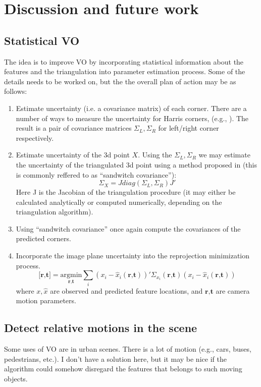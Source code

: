 \documentclass[10pt]{article}         %
\begin{document}
\section{Discussion and future work}

\subsection{Statistical VO}

The idea is to improve VO by incorporating statistical information about the features and the triangulation into parameter estimation process. Some of the details needs to be worked on, but the the overall plan of action may be as follows:
\begin{enumerate}
  
\item Estimate uncertainty (i.e. a covariance matrix) of each corner. There are a number of ways to measure the uncertainty for Harris corners, (e.g., \cite{orguner2007statistical}).  The result is a pair of covariance matrices $\Sigma_L,\Sigma_R$ for left/right corner respectively.
\item Estimate uncertainty of the 3d point $X$. Using the $\Sigma_L,\Sigma_R$  we may estimate the uncertainty of the triangulated 3d point using a method proposed in \cite{matthies1989dynamic} (this is commonly reffered to as ``sandwitch covariance''):
\[
\Sigma_{X} = J diag(\Sigma_L, \Sigma_R) J'
\]
Here J is the Jacobian of the triangulation procedure (it may either be calculated analytically or computed numerically, depending on the triangulation algorithm).
\item Using ``sandwitch covariance'' once again compute the covariances of the predicted corners.
\item Incorporate the image plane uncertainty into the reprojection minimization process.
\[
\textbf{[r,t]} = \underset{\textbf{r,t}}{\text{argmin}} \sum_i (x_i-\hat{x}_i(\textbf{r,t}))'\Sigma_{x_i}(\textbf{r,t})(x_i-\hat{x}_i(\textbf{r,t}))
\]
where $x,\hat{x}$ are observed and predicted feature locations, and $\textbf{r,t}$ are camera motion parameters.
\end{enumerate}
\subsection{Detect relative motions in the scene}

Some uses of VO are in urban scenes.  There is a lot of motion (e.g., cars, buses, pedestrians, etc.).  I don't have a solution here, but it may be nice if the algorithm could somehow disregard the features that belongs to such moving objects.
\end{document}
